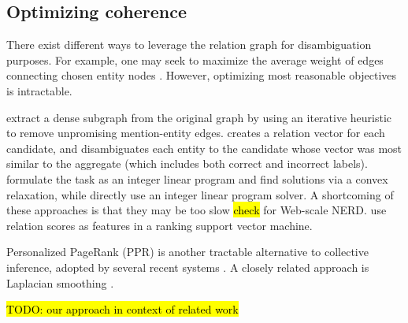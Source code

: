 \subsection{Optimizing coherence}

There exist different ways to leverage the relation graph for disambiguation purposes.  For example, one may seek to maximize the average weight of edges connecting chosen entity nodes \cite{Milne2008,Ferragina10}.  However, optimizing most reasonable objectives is intractable.  %

 \cite{Hoffart2011} extract a dense subgraph from the original graph by using an iterative heuristic to remove unpromising mention-entity edges. \cite{Cucerzan07} creates a relation vector for each candidate, and disambiguates each entity to the candidate whose vector was most similar to the aggregate (which includes both correct and incorrect labels).  formulate the task as an integer linear program and find solutions via a convex relaxation, while  directly use an integer linear program solver. A shortcoming of these approaches is that they may be too slow \hl{check} for Web-scale NERD.  use relation scores as features in a ranking support vector machine.
 
 Personalized PageRank (PPR) \cite{jeh2003scaling} is another tractable alternative to collective inference, adopted by several recent systems \cite{Han2011,He13,Alhelbawy14,Pershina2015}. A closely related approach is Laplacian smoothing \cite{Huang2014}.  

\hl{TODO: our approach in context of related work}



